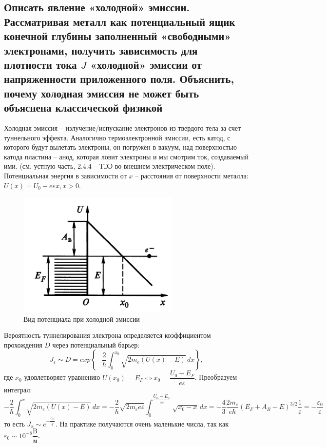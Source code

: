 \subsection{Описать явление «холодной» эмиссии. Рассматривая металл как потенциальный ящик
конечной глубины заполненный «свободными» электронами, получить зависимость для плотности
тока $J$ «холодной» эмиссии от напряженности приложенного поля. Объяснить, почему холодная
эмиссия не может быть объяснена классической физикой}

Холодная эмиссия -- излучение/испускание электронов из твердого тела за счет туннельного
эффекта. Аналогично термоэлектронной эмиссии, есть катод, с которого будут вылетать электроны,
он погружён в вакуум, над поверхностью катода пластина -- анод, которая ловит электроны и мы 
смотрим ток, создаваемый ими. (см. устную часть, 2.4.4 -- ТЭЭ во внешнем электрическом поле).
Потенциальная энергия в зависимости от $x$ -- расстояния от поверхности металла: 
$U(x) = U_0 - e \varepsilon x, x>0$.
\begin{figure}[H]
  \centering
  \includegraphics[width=.9\linewidth]{img/write-08/barier.png}
  \caption{Вид потенциала при холодной эмиссии}
  \label{fig:cold-emission}
\end{figure}

Вероятность туннелирования электрона определяется
коэффициентом прохождения $D$ через потенциальный барьер:
\[
  J_{\varepsilon} \sim D = exp \left\{ - \dfrac{2}{\hbar} \int_0^{x_0} \sqrt{2m_e (U(x) - E)} \, dx \right\},
\]
где $x_0$ удовлетворяет уравнению
$U(x_0) = E_F \Leftrightarrow x_0 = \dfrac{U_0 - E_F}{e \varepsilon}$. Преобразуем интеграл:
\[
  - \dfrac{2}{\hbar} \int_0^{x} \sqrt{2m_e (U(x) - E)} \, dx 
  = - \dfrac{2}{\hbar} \sqrt{2m_e e \varepsilon} \int_0^{\dfrac{U_0-E_F}{e \varepsilon}} \sqrt{ x_0 - x } \, dx
  = - \dfrac{4}{3} \dfrac{2m_e}{e\hbar} (E_F + A_B - E)^{3/2} \dfrac{1}{\varepsilon}
  = - \dfrac{\varepsilon_0}{\varepsilon}
\]
то есть $J_x \sim e^{- \dfrac{\varepsilon_0}{\varepsilon}}$. На практике получаются очень маленькие числа, так как $\varepsilon_0 \sim 10^{-8} \dfrac{\text{B}}{\text{м}}$.
